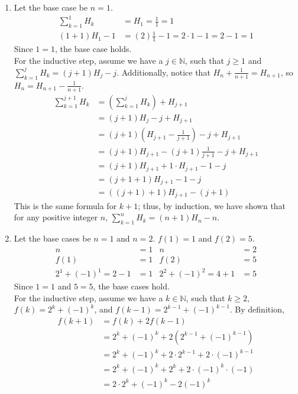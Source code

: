 \documentclass{article}
\begin{document}
\begin{enumerate}[label=\textbf{\arabic*}.]
    \Large
    \item Let the base case be $n=1$.
    \begin{align}
        \sum_{k=1}^{1}H_k&=H_1=\frac{1}{1}=1\\
        (1+1)H_1-1&=(2)\frac{1}{1}-1=2\cdot1-1=2-1=1
    \end{align}
    Since $1=1$, the base case holds.\\
    For the inductive step, assume we have a $j\in\mathbb{N}$, such that $j\geq1$ and $\sum_{k=1}^{j}H_k=(j+1)H_j-j$. Additionally, notice that $H_n+\frac{1}{n+1}=H_{n+1}$, so $H_n=H_{n+1}-\frac{1}{n+1}$.
    \begin{align*}
    \sum_{k=1}^{j+1}H_k &=(\sum_{k=1}^{j}H_k)+H_{j+1}\\
    &=(j+1)H_j-j+H_{j+1}\\
    &=(j+1)(H_{j+1}-\frac{1}{j+1})-j+H_{j+1}\\
    &=(j+1)H_{j+1}-(j+1)\frac{1}{j+1}-j+H_{j+1}\\
    &=(j+1)H_{j+1}+1\cdot H_{j+1}-1-j\\
    &=(j+1+1)H_{j+1}-1-j\\
    &=((j+1)+1)H_{j+1}-(j+1)
    \end{align*}
    This is the same formula for $k+1$; thus, by induction, we have shown that for any positive integer $n$, $\sum_{k=1}^{n}H_k=(n+1)H_n-n$.
    \item Let the base cases be $n=1$ and $n=2$. $f(1)=1$ and $f(2)=5$.
    \begin{align*}
        n&=1 & n&=2\\
        f(1)&=1 & f(2)&=5\\
        2^1+(-1)^1=2-1&=1 & 2^2+(-1)^2=4+1&=5
    \end{align*}
    Since $1=1$ and $5=5$, the base cases hold.\\
    For the inductive step, assume we have a $k\in\mathbb{N}$, such that $k\geq2$, $f(k)=2^k+(-1)^k$, and $f(k-1)=2^{k-1}+(-1)^{k-1}$. By definition,
    \begin{align*}
        f(k+1)&=f(k)+2f(k-1)\\
        &=2^k+(-1)^k+2(2^{k-1}+(-1)^{k-1})\\
        &=2^k+(-1)^k+2\cdot2^{k-1}+2\cdot(-1)^{k-1}\\
        &=2^k+(-1)^k+2^{k}+2\cdot(-1)^{k}\cdot(-1)\\
        &=2\cdot2^k+(-1)^k-2(-1)^{k}\\

\end{align*}
\end{enumerate}
\end{document}
